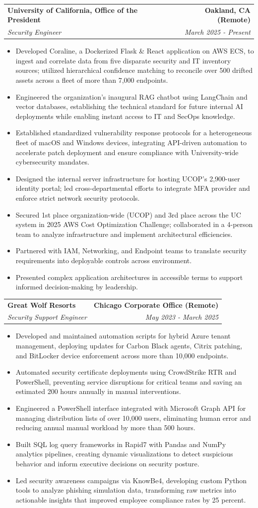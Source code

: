 \documentclass[letterpaper,10pt]{article}
\makeatletter
\newcommand{\resumeItem}[1]{\item{\small #1}}
\newcommand{\resumeItemListStart}{\begin{itemize}}
\newcommand{\resumeItemListEnd}{\end{itemize}\vspace{-2pt}}
\newcommand{\resumeSubheading}[4]{%
  \vspace{-2pt}\item
  \begin{tabular*}{\textwidth}[t]{l@{\extracolsep{\fill}}r}
    \textbf{\large #1} & \textbf{\small #2} \\
    \textit{\large #3} & \textit{\small #4} \\
  \end{tabular*}\vspace{-2pt}
}
\makeatother
\begin{document}
\resumeSubheading
  {University of California, Office of the President}{Oakland, CA (Remote)}
  {Security Engineer}{March 2025 - Present}
  \vspace{4pt}
\resumeItemListStart
  \resumeItem{Developed Coraline, a Dockerized Flask \& React application on AWS ECS, to ingest and correlate data from five disparate security and IT inventory sources; utilized hierarchical confidence matching to reconcile over 500 drifted assets across a fleet of more than 7,000 endpoints.}
  \resumeItem{Engineered the organization's inaugural RAG chatbot using LangChain and vector databases, establishing the technical standard for future internal AI deployments while enabling instant access to IT and SecOps knowledge.}
  \resumeItem{Established standardized vulnerability response protocols for a heterogeneous fleet of macOS and Windows devices, integrating API-driven automation to accelerate patch deployment and ensure compliance with University-wide cybersecurity mandates.}
  \resumeItem{Designed the internal server infrastructure for hosting UCOP's 2,900-user identity portal; led cross-departmental efforts to integrate MFA provider and enforce strict network security protocols.}
  \resumeItem{Secured 1st place organization-wide (UCOP) and 3rd place across the UC system in 2025 AWS Cost Optimization Challenge; collaborated in a 4-person team to analyze infrastructure and implement architectural efficiencies.}
  \resumeItem{Partnered with IAM, Networking, and Endpoint teams to translate security requirements into deployable controls across environment.}
  \resumeItem{Presented complex application architectures in accessible terms to support informed decision-making by leadership.}
  \resumeItemListEnd
\vspace{6pt}

\resumeSubheading
  {Great Wolf Resorts}{Chicago Corporate Office (Remote)}
  {Security Support Engineer}{May 2023 - March 2025}
\vspace{4pt}
\resumeItemListStart
  \resumeItem{Developed and maintained automation scripts for hybrid Azure tenant management, deploying updates for Carbon Black agents, Citrix patching, and BitLocker device enforcement across more than 10,000 endpoints.}
  \resumeItem{Automated security certificate deployments using CrowdStrike RTR and PowerShell, preventing service disruptions for critical teams and saving an estimated 200 hours annually in manual interventions.}
  \resumeItem{Engineered a PowerShell interface integrated with Microsoft Graph API for managing distribution lists of over 10,000 users, eliminating human error and reducing annual manual workload by more than 500 hours.}
  \resumeItem{Built SQL log query frameworks in Rapid7 with Pandas and NumPy analytics pipelines, creating dynamic visualizations to detect suspicious behavior and inform executive decisions on security posture.}
  \resumeItem{Led security awareness campaigns via KnowBe4, developing custom Python tools to analyze phishing simulation data, transforming raw metrics into actionable insights that improved employee compliance rates by 25 percent.}
\resumeItemListEnd
\vspace{6pt}
\end{document}
